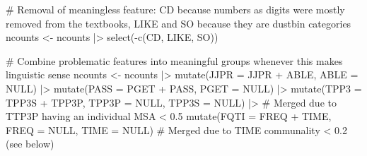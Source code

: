 \documentclass[
  letterpaper,
  DIV=11,
  numbers=noendperiod]{scrreprt}
\newenvironment{Shaded}{\begin{snugshade}}{\end{snugshade}}
\newcommand{\AttributeTok}[1]{\textcolor[rgb]{0.40,0.45,0.13}{#1}}
\newcommand{\CommentTok}[1]{\textcolor[rgb]{0.37,0.37,0.37}{#1}}
\newcommand{\ConstantTok}[1]{\textcolor[rgb]{0.56,0.35,0.01}{#1}}
\newcommand{\FunctionTok}[1]{\textcolor[rgb]{0.28,0.35,0.67}{#1}}
\newcommand{\NormalTok}[1]{\textcolor[rgb]{0.00,0.23,0.31}{#1}}
\newcommand{\OtherTok}[1]{\textcolor[rgb]{0.00,0.23,0.31}{#1}}
\newcommand{\SpecialCharTok}[1]{\textcolor[rgb]{0.37,0.37,0.37}{#1}}
\begin{document}
\begin{Shaded}
\begin{Highlighting}[]
\CommentTok{\# Removal of meaningless feature: CD because numbers as digits were mostly removed from the textbooks, LIKE and SO because they are dustbin categories}
\NormalTok{ncounts }\OtherTok{\textless{}{-}}\NormalTok{ ncounts }\SpecialCharTok{|\textgreater{}} 
  \FunctionTok{select}\NormalTok{(}\SpecialCharTok{{-}}\FunctionTok{c}\NormalTok{(CD, LIKE, SO))}

\CommentTok{\# Combine problematic features into meaningful groups whenever this makes linguistic sense}
\NormalTok{ncounts }\OtherTok{\textless{}{-}}\NormalTok{ ncounts }\SpecialCharTok{|\textgreater{}} 
  \FunctionTok{mutate}\NormalTok{(}\AttributeTok{JJPR =}\NormalTok{ JJPR }\SpecialCharTok{+}\NormalTok{ ABLE, }\AttributeTok{ABLE =} \ConstantTok{NULL}\NormalTok{) }\SpecialCharTok{|\textgreater{}} 
  \FunctionTok{mutate}\NormalTok{(}\AttributeTok{PASS =}\NormalTok{ PGET }\SpecialCharTok{+}\NormalTok{ PASS, }\AttributeTok{PGET =} \ConstantTok{NULL}\NormalTok{) }\SpecialCharTok{|\textgreater{}} 
  \FunctionTok{mutate}\NormalTok{(}\AttributeTok{TPP3 =}\NormalTok{ TPP3S }\SpecialCharTok{+}\NormalTok{ TPP3P, }\AttributeTok{TPP3P =} \ConstantTok{NULL}\NormalTok{, }\AttributeTok{TPP3S =} \ConstantTok{NULL}\NormalTok{) }\SpecialCharTok{|\textgreater{}} \CommentTok{\# Merged due to TTP3P having an individual MSA \textless{} 0.5}
  \FunctionTok{mutate}\NormalTok{(}\AttributeTok{FQTI =}\NormalTok{ FREQ }\SpecialCharTok{+}\NormalTok{ TIME, }\AttributeTok{FREQ =} \ConstantTok{NULL}\NormalTok{, }\AttributeTok{TIME =} \ConstantTok{NULL}\NormalTok{) }\CommentTok{\# Merged due to TIME communality \textless{} 0.2 (see below)}


\end{Highlighting}
\end{Shaded}
\end{document}
